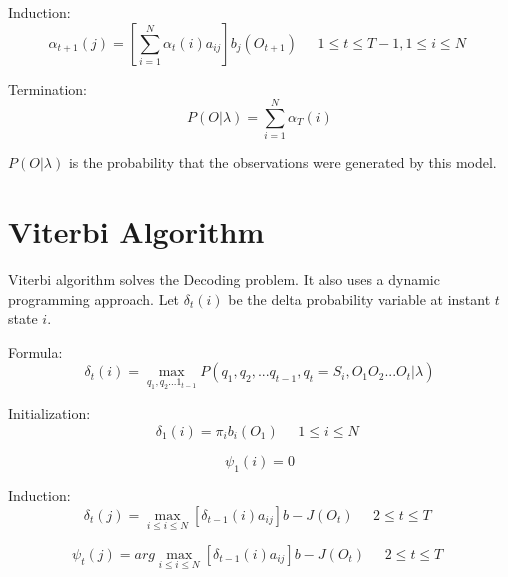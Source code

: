 Induction:
\begin{equation*}
    \alpha_{t+1}(j) = [\sum_{i=1}^N \alpha_t(i)a_{ij}]b_j(O_{t+1})
    \quad \begin{aligned} 1 \leq t \leq T-1, 1 \leq i \leq N \end{aligned}
\end{equation*}

Termination:
\begin{equation*}
    P(O|\lambda) = \sum_{i=1}^{N} \alpha_T(i)
\end{equation*}

$P(O|\lambda)$ is the probability that the observations were generated by this model.

\section{Viterbi Algorithm}
Viterbi algorithm solves the Decoding problem. It also uses a dynamic programming approach. Let $\delta_t(i)$ be the delta probability variable at instant $t$ state $i$.

Formula:
\begin{equation*}
    \delta_t(i) = \max_{q_1, q_2 ... 1_{t-1}} P(q_1, q_2,...q_{t-1}, q_t = S_i, O_1O_2...O_t | \lambda)
\end{equation*}

Initialization:
\begin{equation*}
    \delta_1(i) = \pi_i b_i (O_1)
    \quad \begin{aligned} 1 \leq i \leq N \end{aligned}
\end{equation*}

\begin{equation*}
    \psi_1(i) = 0
\end{equation*}

Induction:
\begin{equation*}
    \delta_t(j) = \max_{i\leq i \leq N}[\delta_{t-1}(i)a_{ij}]b-J(O_t)
    \quad \begin{aligned} 2 \leq t \leq T \end{aligned}
\end{equation*}

\begin{equation*}
    \psi_t(j) = arg\max_{i\leq i \leq N}[\delta_{t-1}(i)a_{ij}]b-J(O_t)
    \quad \begin{aligned} 2 \leq t \leq T \end{aligned}
\end{equation*}

